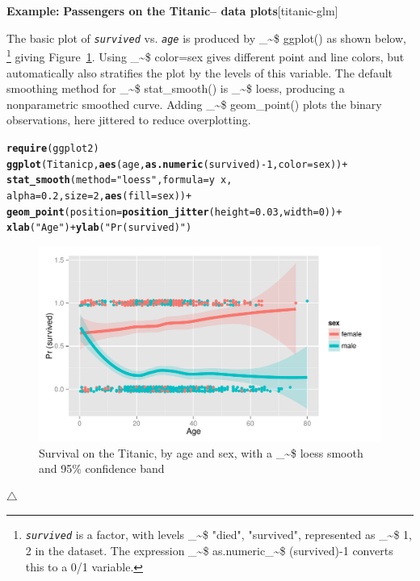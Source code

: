 \documentclass{article}
\makeatletter
\newcommand{\hlnum}[1]{\textcolor[rgb]{0.686,0.059,0.569}{#1}}%
\newcommand{\hlstr}[1]{\textcolor[rgb]{0.192,0.494,0.8}{#1}}%
\newcommand{\hlopt}[1]{\textcolor[rgb]{0,0,0}{#1}}%
\newcommand{\hlstd}[1]{\textcolor[rgb]{0.345,0.345,0.345}{#1}}%
\newcommand{\hlkwc}[1]{\textcolor[rgb]{0.333,0.667,0.333}{#1}}%
\newcommand{\hlkwd}[1]{\textcolor[rgb]{0.737,0.353,0.396}{\textbf{#1}}}%
\newenvironment{kframe}{%
 \def\at@end@of@kframe{}%
 \ifinner\ifhmode%
  \def\at@end@of@kframe{\end{minipage}}%
  \begin{minipage}{\columnwidth}%
 \fi\fi%
 \def\FrameCommand##1{\hskip\@totalleftmargin \hskip-\fboxsep
 \colorbox{shadecolor}{##1}\hskip-\fboxsep
     \hskip-\linewidth \hskip-\@totalleftmargin \hskip\columnwidth}%
 \MakeFramed {\advance\hsize-\width
   \@totalleftmargin\z@ \linewidth\hsize
   \@setminipage}}%
 {\par\unskip\endMakeFramed%
 \at@end@of@kframe}
\newenvironment{knitrout}{}{} %
\newcommand{\figref}[1]{Figure~\ref{#1}}
\newcommand{\var}[1]{\textit{\texttt{#1}}}
\newcommand\code{\bgroup\@makeother\_\@makeother\~\@makeother\$\@codex}
\def\@codex#1{{\normalfont\ttfamily\hyphenchar\font=-1 #1}\egroup}
\newcommand{\func}[1]{\code{#1()}}
\newenvironment{Example}[2][unnamed-example]%
  {\medskip\noindent\textbf{\textsf{Example:}}
   \textbf{#2}\hfill [#1]\par\smallskip
  }
  {\hfill $\triangle$}
\makeatother
\begin{document}
\begin{Example}[titanic-glm]{Passengers on the Titanic-- data plots}
The basic plot of \var{survived} vs. \var{age}
is produced
by \func{ggplot} as shown below,%
\footnote{
\var{survived} is a factor, with levels \code{"died", "survived"},
represented as \code{1, 2} in the dataset.
The expression \linebreak \code{as.numeric}\code{(survived)-1} converts this to
a 0/1 variable.
}
giving \figref{fig:titanic-glm-ggp1}.
Using \code{color=sex} 
gives different point and line colors, but automatically also
stratifies the plot by the levels of this variable.
The default smoothing method for \func{stat\_smooth} is \code{loess},
producing a nonparametric smoothed curve. 
Adding \func{geom\_point} plots the binary observations, here jittered
to reduce overplotting.
\begin{knitrout}
\color{fgcolor}\begin{kframe}
\begin{alltt}
\hlkwd{require}\hlstd{(ggplot2)}
\hlkwd{ggplot}\hlstd{(Titanicp,} \hlkwd{aes}\hlstd{(age,} \hlkwd{as.numeric}\hlstd{(survived)}\hlopt{-}\hlnum{1}\hlstd{,} \hlkwc{color}\hlstd{=sex))} \hlopt{+}
  \hlkwd{stat_smooth}\hlstd{(}\hlkwc{method}\hlstd{=}\hlstr{"loess"}\hlstd{,} \hlkwc{formula}\hlstd{=y}\hlopt{~}\hlstd{x,}
              \hlkwc{alpha}\hlstd{=}\hlnum{0.2}\hlstd{,} \hlkwc{size}\hlstd{=}\hlnum{2}\hlstd{,} \hlkwd{aes}\hlstd{(}\hlkwc{fill}\hlstd{=sex))} \hlopt{+}
  \hlkwd{geom_point}\hlstd{(}\hlkwc{position}\hlstd{=}\hlkwd{position_jitter}\hlstd{(}\hlkwc{height}\hlstd{=}\hlnum{0.03}\hlstd{,} \hlkwc{width}\hlstd{=}\hlnum{0}\hlstd{))} \hlopt{+}
  \hlkwd{xlab}\hlstd{(}\hlstr{"Age"}\hlstd{)} \hlopt{+} \hlkwd{ylab}\hlstd{(}\hlstr{"Pr (survived)"}\hlstd{)}
\end{alltt}
\end{kframe}\begin{figure}[hbt!]

{\centering \includegraphics[width=.6\linewidth]{figure/titanic-glm-ggp1-1} 

}

\caption[Survival on the Titanic, by age and sex, with a \code{loess} smooth and 95\% confidence band]{Survival on the Titanic, by age and sex, with a \code{loess} smooth and 95\% confidence band}\label{fig:titanic-glm-ggp1}
\end{figure}



\end{knitrout}
\end{Example}
\end{document}
